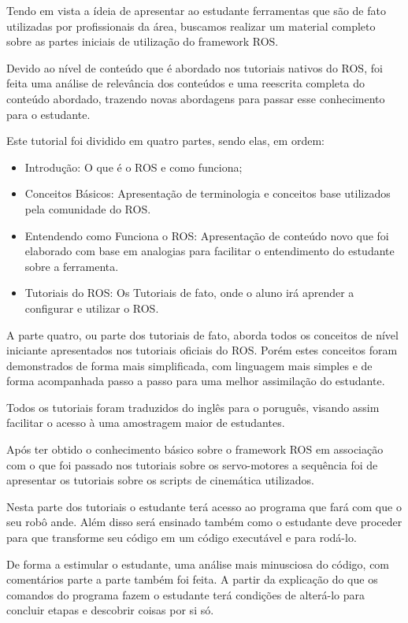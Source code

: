 Tendo em vista a ídeia de apresentar ao estudante ferramentas que são de fato utilizadas por profissionais da área, buscamos realizar um material completo sobre as partes iniciais de utilização do framework ROS.

Devido ao nível de conteúdo que é abordado nos tutoriais nativos do ROS, foi feita uma análise de relevância dos conteúdos e uma reescrita completa do conteúdo abordado, trazendo novas abordagens para passar esse conhecimento para o estudante.

Este tutorial foi dividido em quatro partes, sendo elas, em ordem:
\begin{itemize}
	\item Introdução: O que é o ROS e como funciona;
	\item Conceitos Básicos: Apresentação de terminologia e conceitos base utilizados pela comunidade do ROS.
	\item Entendendo como Funciona o ROS: Apresentação de conteúdo novo que foi elaborado com base em analogias para facilitar o entendimento do estudante sobre a ferramenta.
	\item Tutoriais do ROS: Os Tutoriais de fato, onde o aluno irá aprender a configurar e utilizar o ROS.
\end{itemize}

A parte quatro, ou parte dos tutoriais de fato, aborda todos os conceitos de nível iniciante apresentados nos tutoriais oficiais do ROS. Porém estes conceitos foram demonstrados de forma mais simplificada, com linguagem mais simples e de forma acompanhada passo a passo para uma melhor assimilação do estudante.

Todos os tutoriais foram traduzidos do inglês para o poruguês, visando assim facilitar o acesso à uma amostragem maior de estudantes. \cite{tutROS}

Após ter obtido o conhecimento básico sobre o framework ROS em associação com o que foi passado nos tutoriais sobre os servo-motores a sequência foi de apresentar os tutoriais sobre os scripts de cinemática utilizados.

Nesta parte dos tutoriais o estudante terá acesso ao programa que fará com que o seu robô ande. Além disso será ensinado também como o estudante deve proceder para que transforme seu código em um código executável e para rodá-lo.

De forma a estimular o estudante, uma análise mais minusciosa do código, com comentários parte a parte também foi feita. A partir da explicação do que os comandos do programa fazem o estudante terá condições de alterá-lo para concluir etapas e descobrir coisas por si só.

